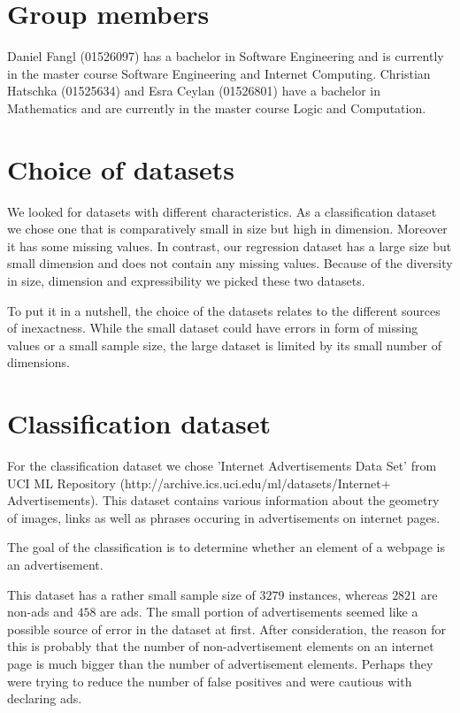 \documentclass[a4paper,12pt]{article}
\begin{document}
\section{Group members}
	Daniel Fangl (01526097) has a bachelor in Software Engineering and is currently in the master course Software Engineering and Internet Computing. Christian Hatschka (01525634) and Esra Ceylan (01526801) have a bachelor in Mathematics and are currently in the master course Logic and Computation. 
	
\section{Choice of datasets}
	We looked for datasets with different characteristics. As a classification data\-set we chose one that is comparatively small in size but high in dimension. Moreover it has some missing values. In contrast, our regression dataset has a large size but small dimension and does not contain any missing values. Because of the diversity in size, dimension and expressibility we picked these two datasets.
	
	To put it in a nutshell, the choice of the datasets relates to the different sources of inexactness. While the small dataset could have errors in form of missing values or a small sample size, the large dataset is limited by its small number of dimensions.

\section{Classification dataset}
	For the classification dataset we chose 'Internet Advertisements Data Set' from UCI ML Repository (http://archive.ics.uci.edu/ml/datasets/Internet+ Advertisements). This dataset contains various information about the geometry of images, links as well as phrases occuring in advertisements on internet pages.
	
	The goal of the classification is to determine whether an element of a webpage is an advertisement.
	
	This dataset has a rather small sample size of $3279$ instances, whereas $2821$ are non-ads and $458$ are ads.	
	The small portion of advertisements seemed like a possible source of error in the dataset at first. After consideration, the reason for this is probably that the number of non-advertisement elements on an internet page is much bigger than the number of advertisement elements. Perhaps they were trying to reduce the number of false positives and were cautious with declaring ads. 
	
\end{document}
